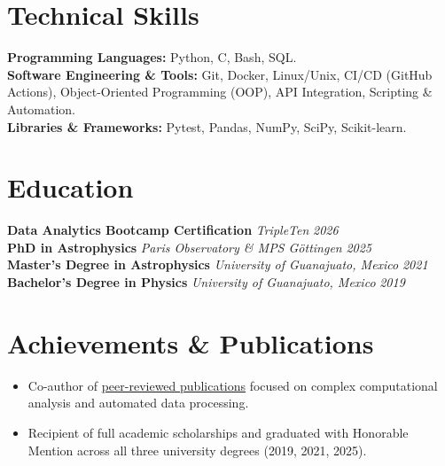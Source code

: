 \documentclass[10pt,a4paper]{article}
\begin{document}
\section*{Technical Skills}
\textbf{Programming Languages:} Python, C, Bash, SQL. \\
\textbf{Software Engineering \& Tools:} Git, Docker, Linux/Unix, CI/CD (GitHub Actions), Object-Oriented Programming (OOP), API Integration, Scripting \& Automation. \\
\textbf{Libraries \& Frameworks:} Pytest, Pandas, NumPy, SciPy, Scikit-learn.

\section*{Education}
\textbf{Data Analytics Bootcamp Certification} \hfill \textit{TripleTen} \hfill \textit{2026}\\
\textbf{PhD in Astrophysics} \hfill \textit{Paris Observatory \& MPS Göttingen} \hfill \textit{2025}\\
\textbf{Master's Degree in Astrophysics} \hfill \textit{University of Guanajuato, Mexico} \hfill \textit{2021}\\
\textbf{Bachelor's Degree in Physics} \hfill \textit{University of Guanajuato, Mexico} \hfill \textit{2019}

\section*{Achievements \& Publications}
\begin{itemize}[leftmargin=1.5em]
    \item Co-author of \href{https://ui.adsabs.harvard.edu/search/fq...}{peer-reviewed publications} focused on complex computational analysis and automated data processing.
    \item Recipient of full academic scholarships and graduated with Honorable Mention across all three university degrees (2019, 2021, 2025).
\end{itemize}
\end{document}

